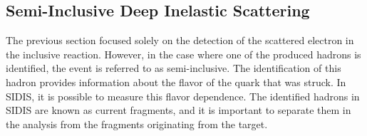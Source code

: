 \subsection{Semi-Inclusive Deep Inelastic Scattering}
\label{10.20::semi_inclusive_deep_inelastic_scattering}
    The previous section focused solely on the detection of the scattered electron in the inclusive reaction.
    However, in the case where one of the produced hadrons is identified, the event is referred to as semi-inclusive.
    The identification of this hadron provides information about the flavor of the quark that was struck.
    In SIDIS, it is possible to measure this flavor dependence.
    The identified hadrons in SIDIS are known as current fragments, and it is important to separate them in the analysis from the fragments originating from the target.

    
